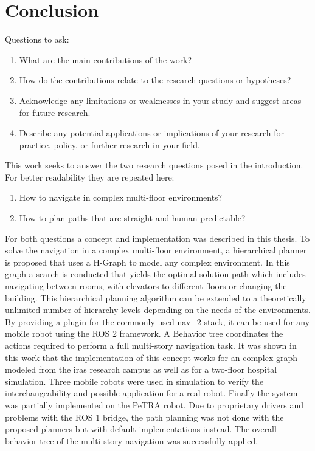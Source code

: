 \chapter{Conclusion}
\label{sec:conclusion}
Questions to ask:
\begin{enumerate}
    \item What are the main contributions of the work? 
    \item How do the contributions relate to the research questions or hypotheses? 
    \item Acknowledge any limitations or weaknesses in your study and suggest areas for future research. 
    \item Describe any potential applications or implications of your research for practice, policy, or further research in your field. 
\end{enumerate}


This work seeks to answer the two research questions posed in the introduction. For better readability they are repeated here:

\begin{enumerate}
    \item How to navigate in complex multi-floor environments?
    \item How to plan paths that are straight and human-predictable?
\end{enumerate}

For both questions a concept and implementation was described in this thesis. To solve the navigation in a complex multi-floor environment, a hierarchical planner is proposed that uses a H-Graph to model any complex environment. In this graph a search is conducted that yields the optimal solution path which includes navigating between rooms, with elevators to different floors or changing the building. This hierarchical planning algorithm can be extended to a theoretically unlimited number of hierarchy levels depending on the needs of the environments. By providing a plugin for the commonly used \gls{nav_2} stack, it can be used for any mobile robot using the ROS 2 framework. A Behavior tree coordinates the actions required to perform a full multi-story navigation task. It was shown in this work that the implementation of this concept works for an complex graph modeled from the \gls{iras} research campus as well as for a two-floor hospital simulation. Three mobile robots were used in simulation to verify the interchangeability and possible application for a real robot. Finally the system was partially implemented on the PeTRA robot. Due to proprietary drivers and problems with the ROS 1 bridge, the path planning was not done with the proposed planners but with default implementations instead. The overall behavior tree of the multi-story navigation was successfully applied.

